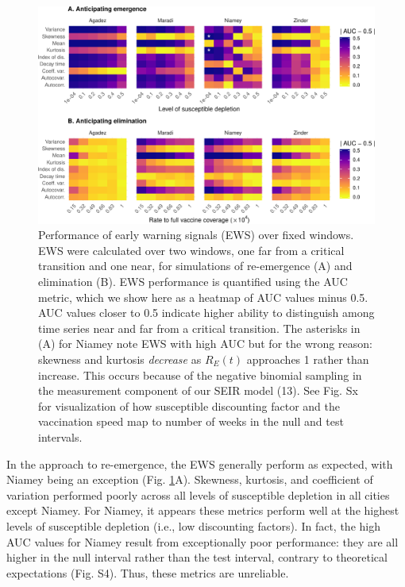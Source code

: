 \documentclass[3p]{elsarticle} %
\makeatletter
\def\maxwidth{\ifdim\Gin@nat@width>\linewidth\linewidth
\else\Gin@nat@width\fi}
\let\Oldincludegraphics\includegraphics
\renewcommand{\includegraphics}[1]{\Oldincludegraphics[width=\maxwidth]{#1}}
\makeatother
\begin{document}
\begin{figure}
\centering
\includegraphics{measles-ews-manuscript_files/figure-latex/aucs-1.pdf}
\caption{Performance of early warning signals (EWS) over fixed windows.
EWS were calculated over two windows, one far from a critical transition
and one near, for simulations of re-emergence (A) and elimination (B).
EWS performance is quantified using the AUC metric, which we show here
as a heatmap of AUC values minus 0.5. AUC values closer to 0.5 indicate
higher ability to distinguish among time series near and far from a
critical transition. The asterisks in (A) for Niamey note EWS with high
AUC but for the wrong reason: skewness and kurtosis \emph{decrease} as
\(R_E(t)\) approaches 1 rather than increase. This occurs because of the
negative binomial sampling in the measurement component of our SEIR
model (13). See Fig. Sx for visualization of how susceptible discounting
factor and the vaccination speed map to number of weeks in the null and
test intervals. \label{aucs}}
\end{figure}

In the approach to re-emergence, the EWS generally perform as expected,
with Niamey being an exception (Fig. \ref{aucs}A). Skewness, kurtosis,
and coefficient of variation performed poorly across all levels of
susceptible depletion in all cities except Niamey. For Niamey, it
appears these metrics perform well at the highest levels of susceptible
depletion (i.e., low discounting factors). In fact, the high AUC values
for Niamey result from exceptionally poor performance: they are all
higher in the null interval rather than the test interval, contrary to
theoretical expectations (Fig. S4). Thus, these metrics are unreliable.
\end{document}
